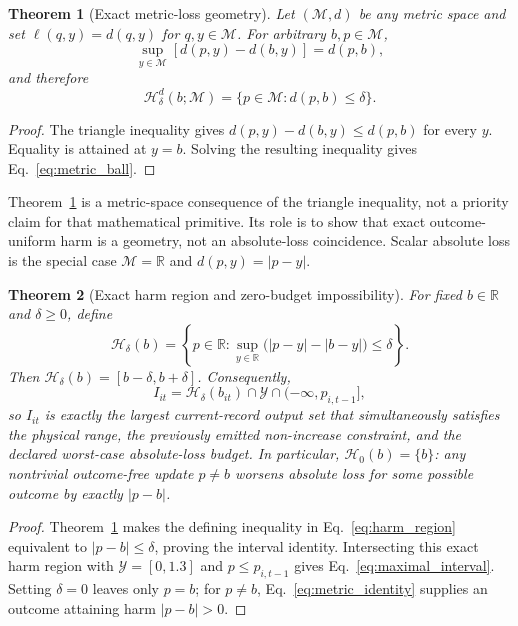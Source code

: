 \documentclass[11pt]{article}
\newtheorem{theorem}{Theorem}
\newcommand{\R}{\mathbb{R}}
\begin{document}
\begin{theorem}[Exact metric-loss geometry]
\label{thm:metric_harm}
Let $(\mathcal M,d)$ be any metric space and set $\ell(q,y)=d(q,y)$ for $q,y\in\mathcal M$. For arbitrary $b,p\in\mathcal M$,
\begin{equation}
  \sup_{y\in\mathcal M}\left[d(p,y)-d(b,y)\right]=d(p,b),
  \label{eq:metric_identity}
\end{equation}
and therefore
\begin{equation}
  \mathcal H^{d}_{\delta}(b;\mathcal M)
  =\{p\in\mathcal M:d(p,b)\leq\delta\}.
  \label{eq:metric_ball}
\end{equation}
\end{theorem}
\begin{proof}
The triangle inequality gives $d(p,y)-d(b,y)\leq d(p,b)$ for every $y$. Equality is attained at $y=b$. Solving the resulting inequality gives Eq.~\eqref{eq:metric_ball}.
\end{proof}

Theorem~\ref{thm:metric_harm} is a metric-space consequence of the triangle inequality, not a priority claim for that mathematical primitive. Its role is to show that exact outcome-uniform harm is a geometry, not an absolute-loss coincidence. Scalar absolute loss is the special case $\mathcal M=\R$ and $d(p,y)=|p-y|$.

\begin{theorem}[Exact harm region and zero-budget impossibility]
\label{thm:harm_region}
For fixed $b\in\R$ and $\delta\geq0$, define
\begin{equation}
  \mathcal H_\delta(b)=\left\{p\in\R:
  \sup_{y\in\R}\bigl(|p-y|-|b-y|\bigr)\leq\delta\right\}.
  \label{eq:harm_region}
\end{equation}
Then $\mathcal H_\delta(b)=[b-\delta,b+\delta]$. Consequently,
\begin{equation}
  I_{it}=\mathcal H_\delta(b_{it})\cap\mathcal Y
  \cap(-\infty,p_{i,t-1}],
  \label{eq:maximal_interval}
\end{equation}
so $I_{it}$ is exactly the largest current-record output set that simultaneously satisfies the physical range, the previously emitted non-increase constraint, and the declared worst-case absolute-loss budget. In particular, $\mathcal H_0(b)=\{b\}$: any nontrivial outcome-free update $p\neq b$ worsens absolute loss for some possible outcome by exactly $|p-b|$.
\end{theorem}
\begin{proof}
Theorem~\ref{thm:metric_harm} makes the defining inequality in Eq.~\eqref{eq:harm_region} equivalent to $|p-b|\leq\delta$, proving the interval identity. Intersecting this exact harm region with $\mathcal Y=[0,1.3]$ and $p\leq p_{i,t-1}$ gives Eq.~\eqref{eq:maximal_interval}. Setting $\delta=0$ leaves only $p=b$; for $p\neq b$, Eq.~\eqref{eq:metric_identity} supplies an outcome attaining harm $|p-b|>0$.
\end{proof}
\end{document}
